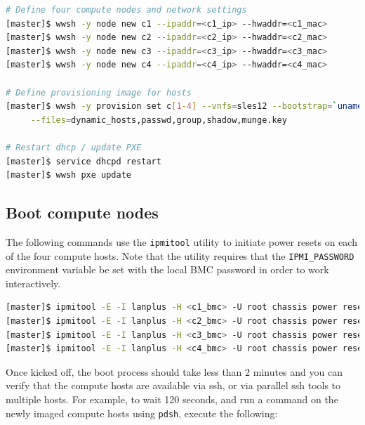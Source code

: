 \documentclass[letterpaper]{article}
\begin{document}

\begin{lstlisting}[language=bash,keywords={},upquote=true,basicstyle=\footnotesize\ttfamily]
# Define four compute nodes and network settings 
[master]$ wwsh -y node new c1 --ipaddr=<c1_ip> --hwaddr=<c1_mac> 
[master]$ wwsh -y node new c2 --ipaddr=<c2_ip> --hwaddr=<c2_mac> 
[master]$ wwsh -y node new c3 --ipaddr=<c3_ip> --hwaddr=<c3_mac> 
[master]$ wwsh -y node new c4 --ipaddr=<c4_ip> --hwaddr=<c4_mac> 

# Define provisioning image for hosts
[master]$ wwsh -y provision set c[1-4] --vnfs=sles12 --bootstrap=`uname -r` \
     --files=dynamic_hosts,passwd,group,shadow,munge.key 

# Restart dhcp / update PXE
[master]$ service dhcpd restart
[master]$ wwsh pxe update
\end{lstlisting}

\subsection{Boot compute nodes}

 
The following commands use the \texttt{ipmitool} utility to initiate power
resets on each of the four compute hosts. Note that the utility requires that
the \texttt{IPMI\_PASSWORD} environment variable be set with the local BMC password in
order to work interactively.


\begin{lstlisting}[language=bash,keywords={},upquote=true]
[master]$ ipmitool -E -I lanplus -H <c1_bmc> -U root chassis power reset   # power cycle c1
[master]$ ipmitool -E -I lanplus -H <c2_bmc> -U root chassis power reset   # power cycle c2
[master]$ ipmitool -E -I lanplus -H <c3_bmc> -U root chassis power reset   # power cycle c3
[master]$ ipmitool -E -I lanplus -H <c4_bmc> -U root chassis power reset   # power cycle c4
\end{lstlisting} 


Once kicked off, the boot process should take less than 2 minutes and you can
verify that the compute hosts are available via ssh, or via parallel ssh tools to multiple
hosts. For example, to wait 120 seconds, and run a command on the newly imaged
compute hosts using \texttt{pdsh}, execute the following:
\end{document}
